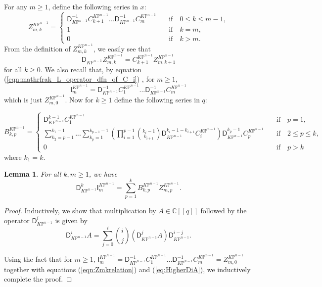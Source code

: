 \documentclass[12pt]{amsart}
\newtheorem{lem}[prop]{Lemma}
\numberwithin{equation}{section}
\newcommand{\KP}{K\mathbb{P}}
\begin{document}
For any $m\geq{1}$, define the following series in $x$:
\begin{equation*}
Z^{\KP^{n-1}}_{m,k}=
\begin{cases}
\mathsf{D}_{\KP^{n-1}}^{-1}C^{\KP^{n-1}}_{k+1}...\mathsf{D}_{\KP^{n-1}}^{-1}C^{\KP^{n-1}}_{m}\quad&\text{if}\quad 0\leq k \leq m-1,\\
1\quad&\text{if}\quad k=m,\\
0\quad&\text{if}\quad k>m.
\end{cases}
\end{equation*}
From the definition of $Z^{\KP^{n-1}}_{m,k}$, we easily see that
\begin{equation}\label{eqn:Zmkrelation}
\mathsf{D}_{\KP^{n-1}}Z^{\KP^{n-1}}_{m,k}=C^{\KP^{n-1}}_{k+1}Z^{\KP^{n-1}}_{m,k+1}
\end{equation}
for all $k\geq{0}$. We also recall that, by equation (\ref{eqn:mathrfrak_L_operator_dfn_of_C_i}) , for $m\geq{1}$, $$\mathsf{I}^{\KP^{n-1}}_m=\mathsf{D}_{\KP^{n-1}}^{-1}C^{\KP^{n-1}}_{1}...\mathsf{D}_{\KP^{n-1}}^{-1}C^{\KP^{n-1}}_{m}$$ which is just $Z^{\KP^{n-1}}_{m,0}$. Now for $k\geq 1$ define the following series in $q$:

\begin{equation*}
B^{\KP^{n-1}}_{k,p}=
\begin{cases}
\mathsf{D}_{\KP^{n-1}}^{k-1}C^{\KP^{n-1}}_1\quad&\text{if}\quad p=1,\\
\sum\limits_{k_2=p-1}^{k_1-1}...\sum\limits_{k_p=1}^{k_{p-1}-1}\left(\prod\limits_{i=1}^{p-1}\binom{k_{i}-1}{k_{i+1}}\mathsf{D}_{\KP^{n-1}}^{k_i-1-k_{i+1}}C^{\KP^{n-1}}_i\right)\mathsf{D}_{\KP^{n-1}}^{k_p-1}C^{\KP^{n-1}}_p \quad&\text{if}\quad 2\leq{p}\leq{k},\\
0\quad&\text{if}\quad p>k
\end{cases}
\end{equation*}
where $k_1=k$.

\begin{lem}\label{lem:DkImCommutator}
For all $k,m\geq{1}$, we have
\begin{equation*}
\mathsf{D}_{\KP^{n-1}}^k\mathsf{I}^{\KP^{n-1}}_m=\sum\limits_{p=1}^kB^{\KP^{n-1}}_{k,p}Z^{\KP^{n-1}}_{m,p}.
\end{equation*}
\end{lem}

\begin{proof}
Inductively, we show that multiplication by $A\in\mathbb{C}[\![q]\!]$ followed by the operator $\mathsf{D}_{\KP^{n-1}}^i$ is given by
\begin{equation}\label{eq:HigherDiA}
\mathsf{D}_{\KP^{n-1}}^iA=\sum_{j=0}^i\binom{i}{j}(\mathsf{D}_{\KP^{n-1}}^jA)\mathsf{D}_{\KP^{n-1}}^{i-j}.
\end{equation}

Using the fact that for $m\geq{1}$, $\mathsf{I}^{\KP^{n-1}}_m=\mathsf{D}_{\KP^{n-1}}^{-1}C^{\KP^{n-1}}_{1}...\mathsf{D}_{\KP^{n-1}}^{-1}C^{\KP^{n-1}}_{m}=Z^{\KP^{n-1}}_{m,0}$ together with equations (\ref{eqn:Zmkrelation}) and (\ref{eq:HigherDiA}), we inductively complete the proof.
\end{proof}
\end{document}
